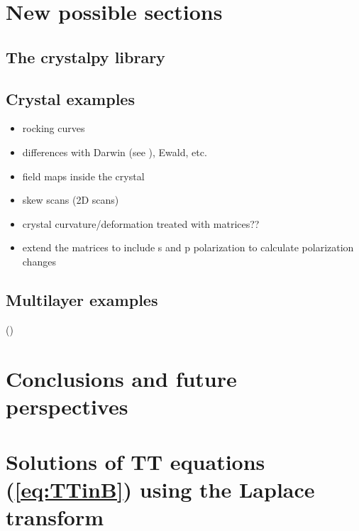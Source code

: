 \documentclass[preprint]{iucr}              %
\newcommand{\inred}[1]{{\color{red}#1}}
\begin{document}
%
\inred{
\section{New possible sections}
\subsection{The crystalpy library}
\subsection{Crystal examples}
\begin{itemize}
    \item rocking curves
    \item differences with Darwin (see \cite{yashiro2001, Yashiro2000}), Ewald, etc. 
    \item field maps inside the crystal
    \item skew scans (2D scans)
    \item crystal curvature/deformation treated with matrices??
    \item extend the matrices to include s and p polarization to calculate polarization changes
\end{itemize}

\subsection{Multilayer examples }
(\cite{Osterhoff2012, Osterhoff2013})
\section{Conclusions and future perspectives}
\label{sec:summary}

}





\appendix

\section{Solutions of TT equations (\ref{eq:TTinB}) using the Laplace transform}
\label{appendix:laplace}
\end{document}
